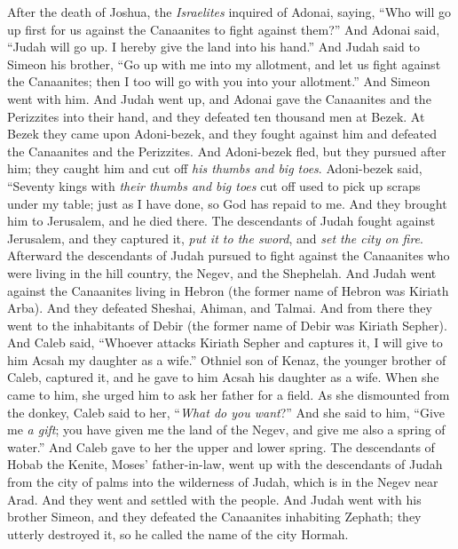 
\begin{biblechapter} %
 After the death of Joshua, the \textit{Israelites} inquired of Adonai, saying, “Who will go up first for us against the Canaanites to fight against them?”
\verse And Adonai said, “Judah will go up. I hereby give the land into his hand.”
\verse And Judah said to Simeon his brother, “Go up with me into my allotment, and let us fight against the Canaanites; then I too will go with you into your allotment.” And Simeon went with him.
\verse And Judah went up, and Adonai gave the Canaanites and the Perizzites into their hand, and they defeated ten thousand men at Bezek.
\verse At Bezek they came upon Adoni-bezek, and they fought against him and defeated the Canaanites and the Perizzites.
\verse And Adoni-bezek fled, but they pursued after him; they caught him and cut off \textit{his thumbs and big toes}.
\verse Adoni-bezek said, “Seventy kings with \textit{their thumbs and big toes} cut off used to pick up scraps under my table; just as I have done, so God has repaid to me. And they brought him to Jerusalem, and he died there.
\verse The descendants of Judah fought against Jerusalem, and they captured it, \textit{put it to the sword}, and \textit{set the city on fire}.
\verse Afterward the descendants of Judah pursued to fight against the Canaanites who were living in the hill country, the Negev, and the Shephelah.
\verse And Judah went against the Canaanites living in Hebron (the former name of Hebron was Kiriath Arba). And they defeated Sheshai, Ahiman, and Talmai.
\verse And from there they went to the inhabitants of Debir (the former name of Debir was Kiriath Sepher).
\verse And Caleb said, “Whoever attacks Kiriath Sepher and captures it, I will give to him Acsah my daughter as a wife.”
\verse Othniel son of Kenaz, the younger brother of Caleb, captured it, and he gave to him Acsah his daughter as a wife.
\verse When she came to him, she urged him to ask her father for a field. As she dismounted from the donkey, Caleb said to her, “\textit{What do you want}?”
\verse And she said to him, “Give me \textit{a gift}; you have given me the land of the Negev, and give me also a spring of water.” And Caleb gave to her the upper and lower spring.
\verse The descendants of Hobab the Kenite, Moses’ father-in-law, went up with the descendants of Judah from the city of palms into the wilderness of Judah, which is in the Negev near Arad. And they went and settled with the people.
\verse And Judah went with his brother Simeon, and they defeated the Canaanites inhabiting Zephath; they utterly destroyed it, so he called the name of the city Hormah.

\end{biblechapter}
